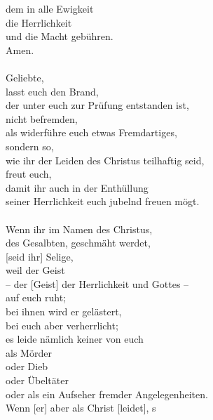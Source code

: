                         dem in alle Ewigkeit \\
                        die Herrlichkeit \\
                        und die Macht gebühren. \\
    Amen. \\
\\
    Geliebte, \\
        lasst euch den Brand, \\
            der unter euch zur Prüfung entstanden ist, \\
            nicht befremden, \\
            als widerführe euch etwas Fremdartiges, \\
        sondern so, \\
            wie ihr der Leiden des Christus teilhaftig seid, \\
            freut euch, \\
            damit ihr auch in der Enthüllung \\
                seiner Herrlichkeit euch jubelnd freuen mögt. \\
\\
        Wenn ihr im Namen des Christus, \\
        des Gesalbten, geschmäht werdet, \\
        [seid ihr] Selige, \\
            weil der Geist \\
            – der [Geist] der Herrlichkeit und Gottes – \\
            auf euch ruht; \\
                bei ihnen wird er gelästert, \\
                bei euch aber verherrlicht; \\
            es leide nämlich keiner von euch\\
                 als Mörder \\
                 oder Dieb \\
                 oder Übeltäter \\
                 oder als ein Aufseher fremder Angelegenheiten. \\
            Wenn [er] aber als Christ [leidet], s\\
